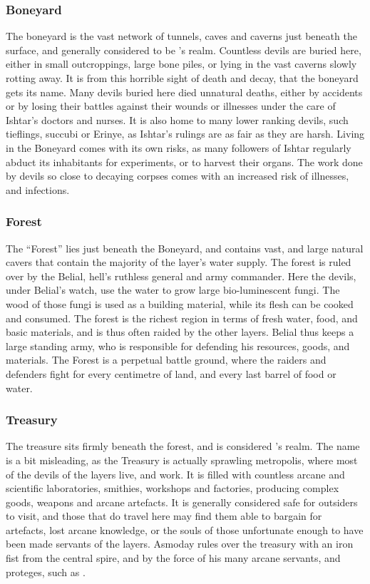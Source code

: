 \subsubsection{Boneyard}
\label{sec:Boneyard}

The boneyard is the vast network of tunnels, caves and caverns just beneath
the surface, and generally considered to be 's
realm. Countless devils are buried here, either in small outcroppings, large
bone piles, or lying in the vast caverns slowly rotting away. It is from this
horrible sight of death and decay, that the boneyard gets its name. Many
devils buried here died unnatural deaths, either by accidents or by losing
their battles against their wounds or illnesses under the care of Ishtar's
doctors and nurses. It is also home to many lower ranking devils, such
tieflings, succubi or Erinye, as Ishtar's rulings are as fair as they are
harsh. Living in the Boneyard comes with its own risks, as many followers of
Ishtar regularly abduct its inhabitants for experiments, or to harvest their
organs. The work done by devils so close to decaying corpses comes with an
increased risk of illnesses, and infections.

\subsubsection{Forest}
\label{sec:Forest}

The ``Forest'' lies just beneath the Boneyard, and contains vast, and large
natural cavers that contain the majority of the layer's water supply. The
forest is ruled over by the Belial, hell's ruthless general and army
commander. Here the devils, under Belial's watch, use the water to grow large
bio-luminescent fungi. The wood of those fungi is used as a building material,
while its flesh can be cooked and consumed. The forest is the richest region
in terms of fresh water, food, and basic materials, and is thus often raided
by the other layers. Belial thus keeps a large standing army, who is responsible
for defending his resources, goods, and materials. The Forest is a perpetual
battle ground, where the raiders and defenders fight for every centimetre of
land, and every last barrel of food or water.

\subsubsection{Treasury}
\label{sec:Treasury}

The treasure sits firmly beneath the forest, and is considered
's realm. The name is a bit misleading, as the Treasury
is actually sprawling metropolis, where most of the devils of the layers live,
and work. It is filled with countless arcane and scientific laboratories,
smithies, workshops and factories, producing complex goods, weapons and arcane
artefacts. It is generally considered safe for outsiders to visit, and those
that do travel here may find them able to bargain for artefacts, lost arcane
knowledge, or the souls of those unfortunate enough to have been made servants
of the layers. Asmoday rules over the treasury with an iron fist from the
central spire, and by the force of his many arcane servants, and proteges,
such as .

